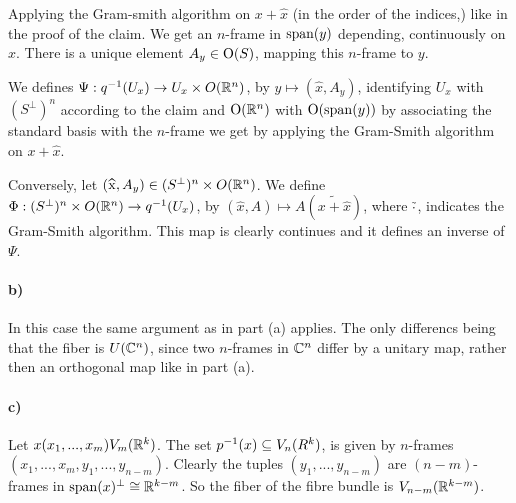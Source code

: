 \documentclass[a4paper,11pt,english]{article}
\newcommand{\orth}{\bot}
\begin{document}
\begin{exercise}[1]
Applying the Gram-smith algorithm on $x + \hat x$ (in the order of the indices,)
like in the proof of the claim. We get an $n$-frame in $\operatorname{span}(y)$ depending,
continuously on $\hat x$. There is a unique element $A_y\in \operatorname{O}(S)$, mapping
this $n$-frame to $y$. 

We defines $\Psi: q^{-1}(U_x) \to U_x \times O(\mathbb{R}^n)$, by $y \mapsto (\hat x,
A_y)$, identifying $U_x$ with $(S^\orth)^n$ according to the claim and
$\operatorname{O}(\mathbb{R}^n)$ with $\operatorname{O}(\operatorname{span}(y))$ by associating the standard basis with the
$n$-frame we get by applying the Gram-Smith algorithm on $x+\hat x$.



Conversely, let $(\hat x, A_y) \in (S^\orth)^n \times O(\R^n)$. We define $\Phi:
(S^\orth)^n \times O(\R^n) \to q\i(U_x)$, by $(\hat x, A) \mapsto
A(\widetilde{x+\hat x})$, where $\tilde \cdot$, indicates the Gram-Smith
algorithm. This map is clearly continues and it defines an inverse of $\Psi$.



\paragraph{b)}
In this case the same argument as in part (a) applies. The only differencs being
that the fiber is $U(\mathbb{C}^n)$, since two $n$-frames in $\mathbb{C}^n$ differ by a unitary
map, rather then an orthogonal map like in part (a).

\paragraph{c)}
Let $x(x_1,...,x_m) V_m(\mathbb{R}^k)$. The set
$p^{-1}(x) \subseteq V_n(R^k)$, is given by $n$-frames $(x_1,...,x_m, y_1,..., y_{n-m})$. Clearly the
tuples $(y_1,...,y_{n-m})$ are $(n-m)$-frames in $\span(x)^\orth \cong
\R^{k-m}$. So the fiber of the fibre bundle is $V_{n-m}(\mathbb{R}^{k-m})$.


\end{exercise}
\end{document}
